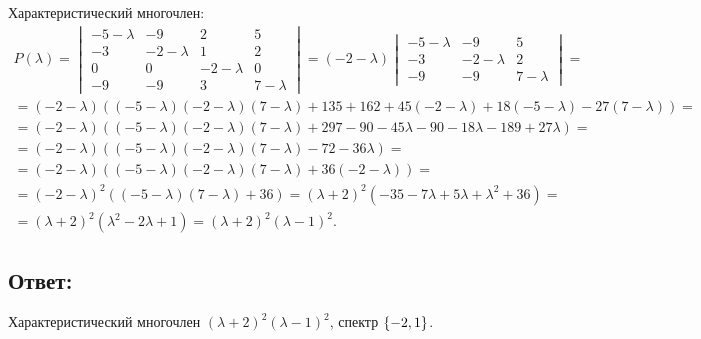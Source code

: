 \documentclass[12pt]{article}
\begin{document}
    Характеристический многочлен:
    \begin{multline*}
        P(\lambda)
        = \begin{vmatrix}
              -5 - \lambda & -9           & 2            & 5           \\
              -3           & -2 - \lambda & 1            & 2           \\
              0            & 0            & -2 - \lambda & 0           \\
              -9           & -9           & 3            & 7 - \lambda
        \end{vmatrix}
        = ( -2 - \lambda)
        \begin{vmatrix}
            -5 - \lambda & -9           & 5           \\
            -3           & -2 - \lambda & 2           \\
            -9           & -9           & 7 - \lambda
        \end{vmatrix} = \\
        = (-2 - \lambda) ( (-5 - \lambda)(-2 - \lambda)(7 - \lambda) + 135 + 162 + 45(-2 - \lambda) + 18 (-5 - \lambda) - 27(7 - \lambda) ) = \\
        = (-2 - \lambda) ( (-5 - \lambda)(-2 - \lambda)(7 - \lambda) + 297 - 90 - 45 \lambda - 90 - 18 \lambda - 189 + 27 \lambda ) = \\
        = (-2 - \lambda) ( (-5 - \lambda)(-2 - \lambda)(7 - \lambda) - 72 - 36 \lambda ) = \\
        = (-2 - \lambda) ( (-5 - \lambda)(-2 - \lambda)(7 - \lambda) + 36 (- 2 - \lambda ) ) = \\
        = (-2 - \lambda)^2 ( (-5 - \lambda)(7 - \lambda) + 36 )
        = (\lambda + 2)^2 (-35 - 7 \lambda + 5 \lambda + \lambda^2 + 36) = \\
        = (\lambda + 2)^2 (\lambda^2 - 2 \lambda + 1)
        = (\lambda + 2)^2 (\lambda - 1)^2 .
    \end{multline*}

    \subsection*{Ответ:}
    Характеристический многочлен $(\lambda + 2)^2 (\lambda - 1)^2$, спектр $\left \{ -2, 1 \right \}$.
\end{document}
